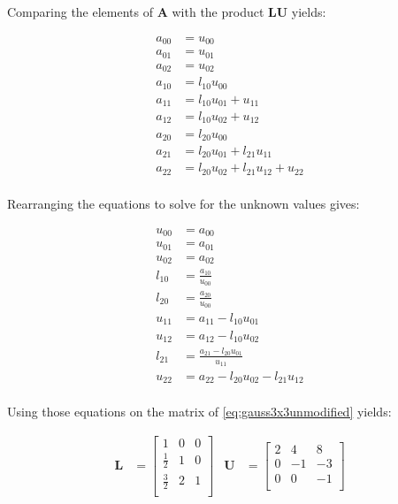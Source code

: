 Comparing the elements of $\mathbf{A}$ with the product $\mathbf{L}\mathbf{U}$ yields:

\begin{align*}
a_{00} &= u_{00}\\
a_{01} &= u_{01}\\
a_{02} &= u_{02}\\
a_{10} &= l_{10}u_{00}\\
a_{11} &= l_{10}u_{01}+u_{11}\\
a_{12} &= l_{10}u_{02}+u_{12}\\
a_{20} &= l_{20}u_{00}\\
a_{21} &= l_{20}u_{01}+l_{21}u_{11}\\
a_{22} &= l_{20}u_{02}+l_{21}u_{12}+u_{22}\\
\end{align*}

Rearranging the equations to solve for the unknown values gives:

\begin{align*}
u_{00} &= a_{00}\\
u_{01} &= a_{01}\\
u_{02} &= a_{02}\\
l_{10} &= \frac{a_{10}}{u_{00}}\\
l_{20} &= \frac{a_{20}}{u_{00}}\\
u_{11} &= a_{11} - l_{10}u_{01}\\
u_{12} &= a_{12} - l_{10}u_{02}\\
l_{21} &= \frac{a_{21} - l_{20}u_{01}}{u_{11}}\\
u_{22} &= a_{22} - l_{20}u_{02} - l_{21}u_{12}\\
\end{align*}


Using those equations on the matrix of \cref{eq:gauss3x3unmodified} yields:


\begin{align}
\label{eq:luDecomposition3x3example}
\mathbf{L} 
& =
\begin{bmatrix}
1          &0     &0\\
\frac{1}{2}&1     &0\\
\frac{3}{2}&2     &1\\
\end{bmatrix}
&
\mathbf{U} 
& =
\begin{bmatrix}
2     &4     &8\\
0     &-1    &-3\\
0     &0     &-1\\
\end{bmatrix}
\end{align}

